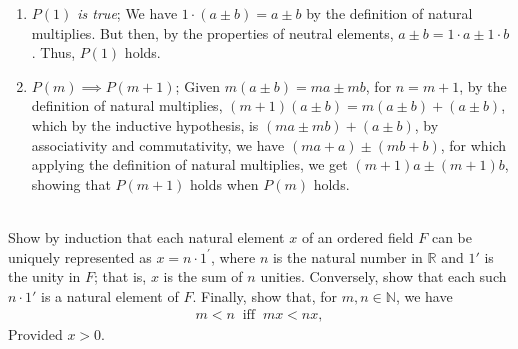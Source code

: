 \documentclass[12pt]{book}
\newcommand{\N}{\mathbb{N}}
\theoremstyle{definition}
\begin{document}
\begin{sol}
\begin{enumerate}[label = (\roman*)]
	\item \textit{$P(1)$ is true}; We have $1\cdot (a\pm b) =a\pm b$ by the definition of natural multiplies. But then, by the properties of neutral elements, $a\pm b= 1\cdot a \pm 1\cdot b$. Thus, $P(1)$ holds.
	\item $P(m)\implies P(m+1)$; Given $m(a\pm b)=ma \pm mb$, for $n=m+1$, by the definition of natural multiplies, $(m+1)(a\pm b) = m(a\pm b)+ (a\pm b)$, which by the inductive hypothesis, is $(ma\pm mb)+(a\pm b)$, by associativity and commutativity, we have $(ma+a)\pm (mb+b)$, for which applying the definition of natural multiplies, we get $(m+1)a \pm (m+1)b$, showing that $P(m+1)$ holds when $P(m)$ holds. 
\end{enumerate}
\end{sol}
\begin{ex}[$11^\prime$ ]
\\
Show by induction that each natural element $x$ of an ordered field $F$ can be uniquely represented as $x=n\cdot 1^{\prime}$, where $n$ is the natural number in $\mathbb{R}$ and $1'$ is the unity in $F$; that is, $x$ is the sum of $n$ unities. 
Conversely, show that each such $n\cdot 1'$ is a natural element of $F$. Finally, show that, for $m,n \in \N$, we have
\begin{align*}
	m<n\;\; \text{iff}\;\; mx<nx, 
\end{align*}
Provided $x>0$.  	
\end{ex}
\end{document}
